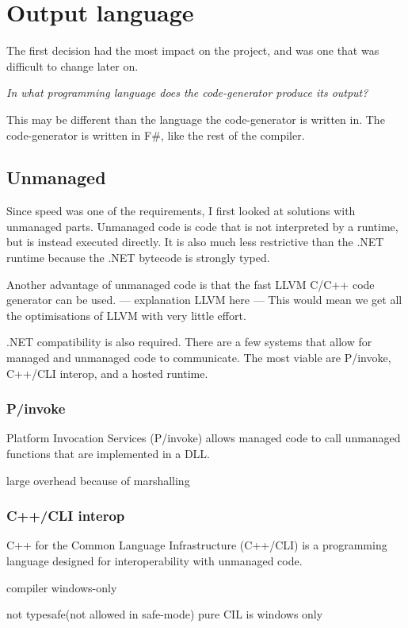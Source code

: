 \section{Output language}
The first decision had the most impact on the project, and was one that was difficult to change later on.

\textit{In what programming language does the code-generator produce its output?}

This may be different than the language the code-generator is written in.
The code-generator is written in F\#, like the rest of the compiler.


\subsection{Unmanaged}
Since speed was one of the requirements, I first looked at solutions with unmanaged parts.
Unmanaged code is code that is not interpreted by a runtime, but is instead executed directly.
It is also much less restrictive than the .NET runtime because the .NET bytecode is strongly typed.\cite{ecma335}

Another advantage of unmanaged code is that the fast LLVM C/C++ code generator can be used.
--- explanation LLVM here ---
This would mean we get all the optimisations of LLVM with very little effort.

.NET compatibility is also required.
There are a few systems that allow for managed and unmanaged code to communicate.
The most viable are P/invoke, C++/CLI interop, and a hosted runtime.

\subsubsection*{P/invoke}
Platform Invocation Services (P/invoke) allows managed code to call unmanaged functions that are implemented in a DLL.\cite{msdn_pinvoke}

large overhead because of marshalling \cite{msdn_interop_performance}

\subsubsection*{C++/CLI interop}
C++ for the Common Language Infrastructure (C++/CLI) is a programming language designed for interoperability with unmanaged code.%

compiler windows-only\cite{mono_c++cli}

not typesafe(not allowed in safe-mode) pure CIL is windows only\cite{mono_c++cli}

